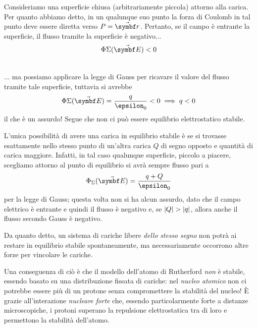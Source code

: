 \begin{demonstration}
\begin{enumerate}
\begin{minipage}{0.54\textwidth}
			Consideriamo una superficie chiusa (arbitrariamente piccola) attorno alla carica.
			Per quanto abbiamo detto, in un qualunque suo punto la forza di Coulomb in tal punto deve essere diretta verso $P=\vba{r}$. Pertanto, se il campo è entrante la superficie, il flusso tramite la superficie è negativo...
			\begin{equation}
				\Phi{\Sigma}(\vba{E})<0
			\end{equation}
		\end{minipage}\\
		... ma possiamo applicare la legge di Gauss per ricavare il valore del flusso tramite tale superficie, tuttavia si avrebbe
		\begin{equation*}
			\Phi{\Sigma}(\vba{E})=\frac{q}{\epsilon_0}<0\implies q<0
		\end{equation*}
		il che è un assurdo! Segue che non ci può essere equilibrio elettrostatico stabile.\qedhere
	\end{enumerate}
\end{demonstration}
L'unica possibilità di avere una carica in equilibrio stabile è se si trovasse esattamente nello stesso punto di un'altra carica $Q$ di segno opposto e quantità di carica maggiore. Infatti, in tal caso qualunque superficie, piccolo a piacere, scegliamo attorno al punto di equilibrio si avrà sempre flusso pari a
\begin{equation*}
	\Phi_{\Sigma}(\vba{E})=\frac{q+Q}{\epsilon_0}
\end{equation*}
per la legge di Gauss; questa volta non si ha alcun assurdo, dato che il campo elettrico è entrante e quindi il flusso è negativo e, se $\abs{Q}>\abs{q}$, allora anche il flusso secondo Gauss è negativo.
\begin{digression}
	Da quanto detto, un sistema di cariche libere \textit{dello stesso segno} non potrà ai restare in equilibrio stabile spontaneamente, ma necessariamente occorrono altre forze per vincolare le cariche.
	
	Una conseguenza di ciò è che il modello dell'atomo di Rutherford \textit{non} è stabile, essendo basato su una distribuzione fissata di cariche: nel \textit{nucleo atomico} non ci potrebbe essere più di un protone senza compromettere la stabilità del nucleo! È grazie all'interazione \textit{nucleare forte} che, essendo particolarmente forte a distanze microscopiche, i protoni superano la repulsione elettrostatica tra di loro e permettono la stabilità dell'atomo.
\end{digression}
